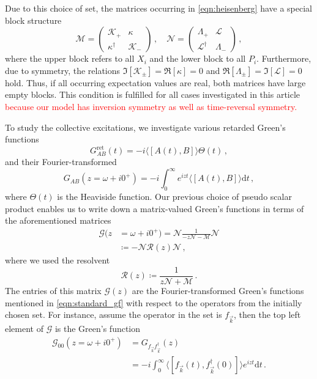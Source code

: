 \documentclass[
    reprint, 
    aps,
    preprintnumbers,
    twocolumn,
    prb,
    superscriptaddress
]{revtex4-2}
\newcommand{\vk}{\vec{k}}
\newcommand{\mM}{\mathcal{M}}
\newcommand{\mN}{\mathcal{N}}
\begin{document}
Due to this choice of set, the matrices occurring in \eqref{eqn:heisenberg} have a special block structure
\begin{equation}
    \label{eqn:xp_set}
    \mM = \begin{pmatrix}
        \mathcal{K}_+ & \kappa \\ \kappa^\dagger & \mathcal{K}_-
    \end{pmatrix}\,,\quad \mN = \begin{pmatrix}
        \Lambda_+ & \mathcal{L} \\ \mathcal{L}^\dagger & \Lambda_-
    \end{pmatrix}\,,
\end{equation}
where the upper block refers to all $X_i$ and the lower block to all $P_i$.
Furthermore, due to symmetry, the relations $\Im [\mathcal{K}_\pm] = \Re [\kappa] = 0$ and $\Re [\Lambda_\pm] = \Im [\mathcal{L}] = 0$ hold.
Thus, if all occurring expectation values are real, both matrices have large empty blocks.
This condition is fulfilled for all cases investigated in this article \textcolor{red}{because our model has inversion symmetry as well as time-reversal symmetry.}

To study the collective excitations, we investigate various retarded Green's functions 
\begin{equation}
    G_{AB}^\text{ret} (t) = - i \langle [A(t), B] \rangle \Theta(t)\,,
\end{equation}
and their Fourier-transformed
\begin{equation}
    \label{eqn:standard_gf}
    G_{AB}(z = \omega + i0^+) = -i \int_0^{\infty} e^{izt} \langle [A(t), B] \rangle \mathrm{d}t\,,
\end{equation}
where $\Theta(t)$ is the Heaviside function.
Our previous choice of pseudo scalar product enables us to write down a matrix-valued Green's functions in terms of the aforementioned matrices
\begin{align}
    \label{eqn:green_function}
    \mathcal{G}(z &= \omega + i0^+) = \mN \frac{1}{-z \mN - \mM} \mN \\
        &\coloneqq  -\mN \mathcal{R}(z) \mN\,,
\end{align}
where we used the resolvent
\begin{equation}
    \label{eqn:resolvent}
    \mathcal{R}(z) \coloneqq  \frac{1}{z \mN + \mM}\,.
\end{equation}
The entries of this matrix $\mathcal{G}(z)$ are the Fourier-transformed Green's functions mentioned in \eqref{eqn:standard_gf} with respect to the operators from the initially chosen set.
For instance, assume the operator in the set is $f_{\vk}$, then the top left element of $\mathcal{G}$ is the Green's function 
\begin{align}
    \mathcal{G}_{00}(z = \omega +i0^+) &=  G_{f_{\vk} f_{\vk}^\dagger} (z) \nonumber \\
        &= -i \int_0^{\infty} \langle [f_{\vk}(t), f_{\vk}^\dagger(0)] \rangle e^{izt} \mathrm{d}t\,.
\end{align}
\end{document}
